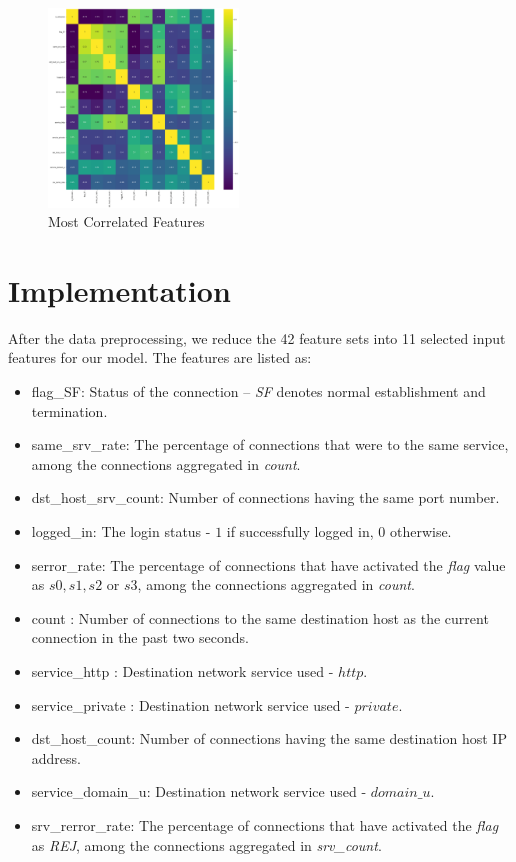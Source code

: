 \documentclass[conference]{IEEEtran}
\begin{document}
\begin{figure}[hbt!]
\centerline{\includegraphics[height= 160 pt, width=0.45\textwidth]{External/Fig-Heatmap.PNG}}
\caption{Most Correlated Features}
\label{fig4}
\end{figure}


\section{Implementation}
After the data preprocessing, we reduce the 42 feature sets into 11 selected input features for our model. The features are listed as:
\begin{itemize}
\item flag\_SF: Status of the connection – \emph{SF} denotes normal establishment and termination.
\item same\_srv\_rate: The percentage of connections that were to the same service, among the connections aggregated in \emph{count}.
\item dst\_host\_srv\_count: Number of connections having the same port number.
\item logged\_in: The login status - $1$ if successfully logged in, $0$ otherwise.
\item serror\_rate: The percentage of connections that have activated the \emph{flag} value as $s0, s1, s2$ or $s3$, among the connections aggregated in \emph{count}.
\item count : Number of connections to the same destination host as the current connection in the past two seconds.
\item service\_http : Destination network service used - $http$.
\item service\_private : Destination network service used - $private$.
\item dst\_host\_count: Number of connections having the same destination host IP address.
\item service\_domain\_u: Destination network service used - $domain\_u$.
\item srv\_rerror\_rate: The percentage of connections that have activated the \emph{flag} as \emph{REJ}, among the connections aggregated in \emph{srv\_count}.
\end{itemize}
\end{document}
